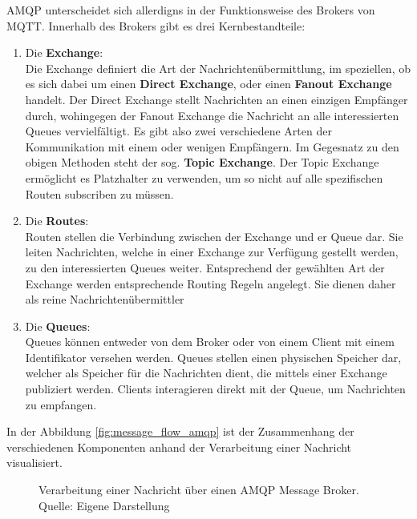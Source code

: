 \ac{AMQP} unterscheidet sich allerdigns in der Funktionsweise des Brokers von \ac{MQTT}. Innerhalb des Brokers gibt es drei Kernbestandteile:
\begin{enumerate}
    \item Die \textbf{Exchange}:\\
    Die Exchange definiert die Art der Nachrichtenübermittlung, im speziellen, ob es sich dabei um einen \textbf{Direct Exchange}, oder einen \textbf{Fanout Exchange} handelt. Der Direct Exchange stellt Nachrichten an einen einzigen Empfänger durch, wohingegen der Fanout Exchange die Nachricht an alle interessierten Queues vervielfältigt. Es gibt also zwei verschiedene Arten der Kommunikation mit einem oder wenigen Empfängern. Im Gegesnatz zu den obigen Methoden steht der sog. \textbf{Topic Exchange}. Der Topic Exchange ermöglicht es Platzhalter zu verwenden, um so nicht auf alle spezifischen Routen subscriben zu müssen.
    \item Die \textbf{Routes}:\\
    Routen stellen die Verbindung zwischen der Exchange und er Queue dar. Sie leiten Nachrichten, welche in einer Exchange zur Verfügung gestellt werden, zu den interessierten Queues weiter. Entsprechend der gewählten Art der Exchange werden entsprechende Routing Regeln angelegt. Sie dienen daher als reine Nachrichtenübermittler
    \item Die \textbf{Queues}:\\
    Queues können entweder von dem Broker oder von einem Client mit einem Identifikator versehen werden. Queues stellen einen physischen Speicher dar, welcher als Speicher für die Nachrichten dient, die mittels einer Exchange publiziert werden. Clients interagieren direkt mit der Queue, um Nachrichten zu empfangen.
\end{enumerate}

In der Abbildung \vref{fig:message_flow_amqp} ist der Zusammenhang der verschiedenen Komponenten anhand der Verarbeitung einer Nachricht visualisiert.

\begin{figure}
    \centering
    \caption{Verarbeitung einer Nachricht über einen \ac{AMQP} Message Broker.\\Quelle: Eigene Darstellung}
    \label{fig:message_flow_amqp}
\end{figure}

